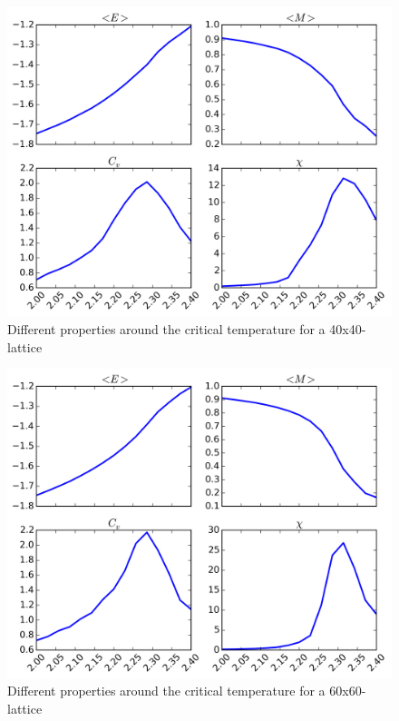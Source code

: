\documentclass[11pt,a4paper,english,draft]{article}
\numberwithin{equation}{section}
\newcommand{\figurewidth}{.85\textwidth}
\begin{document}
\begin{figure}
\centering
\includegraphics[width=\figurewidth]{pics/e40.png}
\caption{Different properties around the critical temperature for 
a 40x40-lattice}
\label{fig:e40}
\end{figure}

\begin{figure}
\centering
\includegraphics[width=\figurewidth]{pics/e60.png}
\caption{Different properties around the critical temperature for 
a 60x60-lattice}
\label{fig:e60}
\end{figure}
\end{document}
